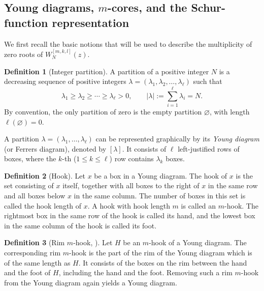 \documentclass[preprint,3p,10pt]{elsarticle}
\theoremstyle{definition}
\newtheorem{definition}{Definition}[section]
\begin{document}
\subsection{Young diagrams, \texorpdfstring{\(m\)-cores}{m-cores}, and the Schur-function representation}
\label{subsec:young-diagrams-mcores-schur}
We first recall the basic notions that will be used to describe the multiplicity of zero roots of \(W_N^{[m,k,l]}(z)\).


\begin{definition}[Integer partition]
A partition of a positive integer $N$ is a decreasing sequence 
of positive integers $\lambda = (\lambda_1,\lambda_2,\ldots,\lambda_\ell)$ such that
\begin{equation}
\lambda_1 \ge \lambda_2 \ge \cdots \ge \lambda_\ell > 0,
\qquad
|\lambda| := \sum_{i=1}^\ell \lambda_i = N.
\end{equation}
By convention, the only partition of zero is the empty partition
\(\varnothing\), with length \(\ell(\varnothing)=0\).
\end{definition}
A partition $\lambda=(\lambda_1,\ldots,\lambda_\ell)$ can be represented graphically
by its \emph{Young diagram} (or Ferrers diagram), denoted by $[\lambda]$.
It consists of $\ell$ left-justified rows of boxes, where the $k$-th ($1\le k \le \ell$) row contains
$\lambda_k$ boxes. 




\begin{definition}[Hook]
Let \(x\) be a box in a Young diagram. The hook of \(x\) is the set consisting of \(x\) itself, together with all boxes to the right of \(x\) in the same row and all boxes below \(x\) in the same column. The number of boxes in this set is called the hook length of \(x\). A hook with hook length \(m\) is called an \(m\)-hook. The rightmost box in the same row of the hook is called its hand, and the lowest box in the same column of the hook is called its foot.
\end{definition}



\begin{definition}[Rim \(m\)-hook, \cite{james2006representation}]\label{def:rim-m-hook}
Let \(H\) be an \(m\)-hook of a Young diagram. The corresponding rim \(m\)-hook is the part of the rim of the Young diagram which is of the same length as \(H\). It consists of the boxes on the rim between the hand and the foot of \(H\), including the hand and the foot. Removing such a rim \(m\)-hook from the Young diagram again yields a Young diagram.
\end{definition}
\end{document}
